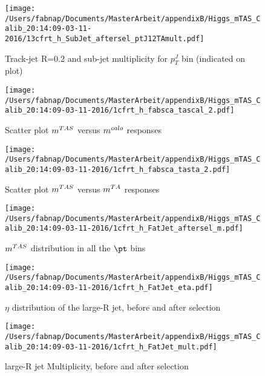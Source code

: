 \begin{figure}

\texttt{[image: /Users/fabnap/Documents/MasterArbeit/appendixB/Higgs\_mTAS\_Calib\_20:14:09-03-11-2016/13cfrt\_h\_SubJet\_aftersel\_ptJ12TAmult.pdf]}
\caption{Track-jet R=0.2 and sub-jet multiplicity for $p_{T}^{J}$ bin (indicated on plot) }

\end{figure}

\clearpage %

\begin{figure}

\texttt{[image: /Users/fabnap/Documents/MasterArbeit/appendixB/Higgs\_mTAS\_Calib\_20:14:09-03-11-2016/1cfrt\_h\_fabsca\_tascal\_2.pdf]}
\caption{Scatter plot $m^{TAS}$ versus $m^{calo}$ responses}

\end{figure}
 
\begin{figure}
 
\texttt{[image: /Users/fabnap/Documents/MasterArbeit/appendixB/Higgs\_mTAS\_Calib\_20:14:09-03-11-2016/1cfrt\_h\_fabsca\_tasta\_2.pdf]}
\caption{Scatter plot $m^{TAS}$ versus $m^{TA}$ responses}
 
\end{figure}
 
\begin{figure}
 
\texttt{[image: /Users/fabnap/Documents/MasterArbeit/appendixB/Higgs\_mTAS\_Calib\_20:14:09-03-11-2016/1cfrt\_h\_FatJet\_aftersel\_m.pdf]}
\caption{$m^{TAS}$ distribution in all the $\pt$ bins}
 
\end{figure}
 
\begin{figure}
 
\texttt{[image: /Users/fabnap/Documents/MasterArbeit/appendixB/Higgs\_mTAS\_Calib\_20:14:09-03-11-2016/1cfrt\_h\_FatJet\_eta.pdf]}
\caption{$\eta$ distribution of the large-R jet, before and after selection}
 
\end{figure}

\begin{figure}
 
\texttt{[image: /Users/fabnap/Documents/MasterArbeit/appendixB/Higgs\_mTAS\_Calib\_20:14:09-03-11-2016/1cfrt\_h\_FatJet\_mult.pdf]}
\caption{large-R jet Multiplicity, before and after selection}
 
\end{figure}
 
